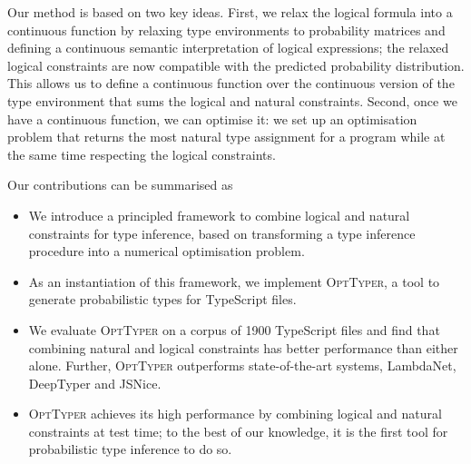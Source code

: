 \documentclass[acmsmall, review, anonymous]{acmart}\settopmatter{printfolios=true,printccs=false,printacmref=false}
\newcommand{\projectname}{\textsc{OptTyper}\xspace}
\newcommand{\margincomment}[2]{\marginpar{\scriptsize\color{Maroon}#1 says: #2}}
\newcommand{\adg}[1]{\margincomment{ADG}{#1}}
\begin{document}
Our method is based on two key ideas.
First, we relax the logical formula into a continuous function by relaxing type environments
to probability matrices and defining
a continuous semantic interpretation of logical expressions; the relaxed logical constraints
are now compatible with the predicted probability distribution.
This allows us to define a continuous function over the continuous version of the type environment
that sums the logical and natural constraints.
Second, once we have a continuous function, we can optimise it:
we set up an optimisation problem that returns the most natural type assignment for a
program while at the same time respecting the logical constraints.


Our contributions can be summarised as
\begin{itemize}[label=\raisebox{0.25ex}{\tiny$\bullet$}]
	\item We introduce a principled framework to combine logical and natural constraints for type inference,
	      based on transforming a type inference procedure into a numerical optimisation problem.
	\item As an instantiation of this framework, we implement \projectname, a tool to generate probabilistic types
	       for TypeScript files.
	\item We evaluate \projectname on a corpus of 1900  TypeScript files and find that combining natural and logical constraints
	      has better performance than either alone.
	      Further, \projectname outperforms state-of-the-art systems,
	      LambdaNet, DeepTyper and JSNice. 
	\item \projectname achieves its high performance by combining logical and natural constraints at test time; to the best of our knowledge, it is the first tool for probabilistic type inference to do so.
	
\end{itemize}
\end{document}
